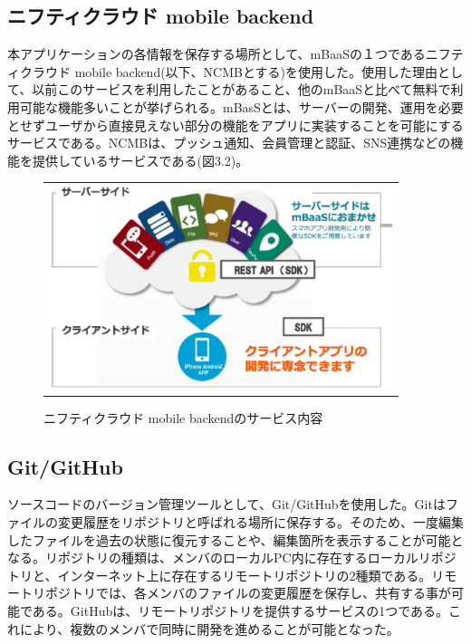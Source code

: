 \subsection{ニフティクラウド mobile backend}%
本アプリケーションの各情報を保存する場所として、mBaaSの１つであるニフティクラウド mobile backend(以下、NCMBとする)を使用した。使用した理由として、以前このサービスを利用したことがあること、他のmBaaSと比べて無料で利用可能な機能多いことが挙げられる。mBasSとは、サーバーの開発、運用を必要とせずユーザから直接見えない部分の機能をアプリに実装することを可能にするサービスである。NCMBは、プッシュ通知、会員管理と認証、SNS連携などの機能を提供しているサービスである(図3.2)。

\begin{figure}[htbp]
  \begin{center}
    \begin{tabular}{c}

      \begin{minipage}{0.7\hsize}
        \begin{center}
\includegraphics[width=10cm]{ncmb_overview.eps}
          \hspace{1cm} %
        \end{center}
      \end{minipage}

    \end{tabular}
    \caption{ニフティクラウド mobile backendのサービス内容}
    \label{fig:lena}
  \end{center}
\end{figure}


\subsection{Git/GitHub}%
ソースコードのバージョン管理ツールとして、Git/GitHubを使用した。Gitはファイルの変更履歴をリポジトリと呼ばれる場所に保存する。そのため、一度編集したファイルを過去の状態に復元することや、編集箇所を表示することが可能となる。リポジトリの種類は、メンバのローカルPC内に存在するローカルリポジトリと、インターネット上に存在するリモートリポジトリの2種類である。リモートリポジトリでは、各メンバのファイルの変更履歴を保存し、共有する事が可能である。GitHubは、リモートリポジトリを提供するサービスの1つである。これにより、複数のメンバで同時に開発を進めることが可能となった。


